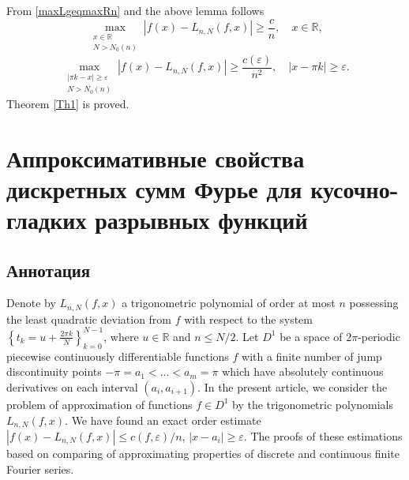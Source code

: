 
From \eqref{maxLgeqmaxRn}  and the above lemma follows
$$
\max_{\substack{x \in \mathbb{R} \\ N > N_0(n)}}\left|f(x) - L_{n,N}(f,x)\right| \geq \frac{c}{n}, \quad x \in \mathbb{R},
$$
$$
\max_{\substack{\left|\pi k - x\right| \geq \varepsilon \\ N > N_0(n)}} \left|f(x) - L_{n,N}(f,x)\right| \geq \frac{c(\varepsilon)}{n^2},\quad \left|x - \pi k\right| \geq \varepsilon.
$$
Theorem \ref{Th1} is proved.

\section{Аппроксимативные свойства дискретных сумм Фурье для кусочно-гладких разрывных функций}
\subsection{Аннотация}
Denote by $L_{n,N}(f,x)$ 
a trigonometric polynomial of order at most $n$ possessing the least quadratic deviation from $f$ with respect to the system
$\left\{t_k = u + \frac{2\pi k}{N}\right\}_{k=0}^{N-1}$, where $u \in \mathbb{R}$ and $n \leq N/2$. 
Let $D^1$ be a space of $2\pi$-periodic piecewise continuously differentiable functions $f$ with a finite number of jump discontinuity points $-\pi = a_1 < \ldots < a_m = \pi$ which have absolutely continuous derivatives on each interval $(a_i, a_{i+1})$.
In the present article, we consider the problem of approximation of functions $f \in D^1$  by the trigonometric polynomials $L_{n,N}(f,x)$.
We have found an exact order estimate $\left|f(x) - L_{n,N}(f,x)\right| \leq c(f,\varepsilon)/n$, $\left|x - a_i\right| \geq \varepsilon$.
The proofs of these estimations based on comparing of approximating properties of discrete and continuous finite Fourier series.

